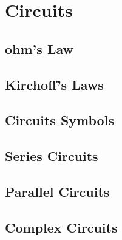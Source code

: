 \chapter{Circuits} \label{chap:Circuits}
\section{ohm's Law}
\section{Kirchoff's Laws}
	\section{Circuits Symbols} 
\section{Series Circuits}
\section{Parallel Circuits}
\section{Complex Circuits}


		
	
	
	

	


